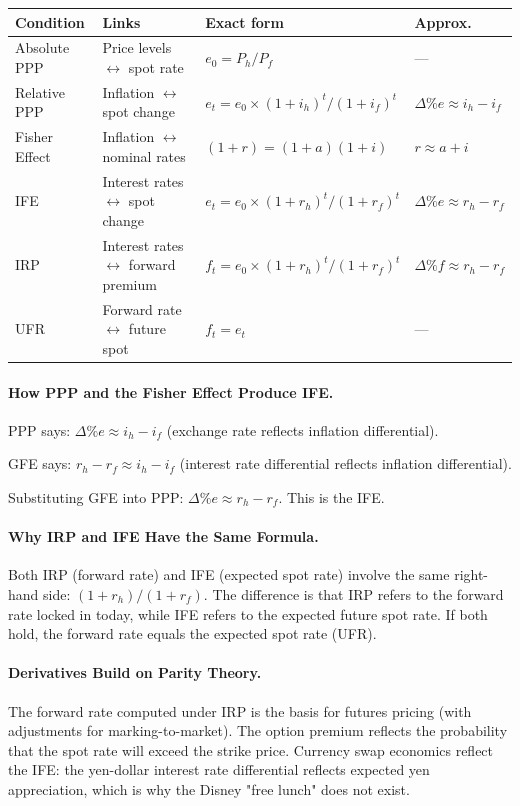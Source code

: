 \documentclass[11pt,a4paper]{article}
\begin{document}
\begin{center}
\begin{tabular}{lp{3.6cm}p{3.8cm}p{2.4cm}}
\toprule
\textbf{Condition} & \textbf{Links} & \textbf{Exact form} & \textbf{Approx.} \\
\midrule
Absolute PPP & Price levels $\leftrightarrow$ spot rate & $e_0 = P_h/P_f$ & --- \\
Relative PPP & Inflation $\leftrightarrow$ spot change & $e_t = e_0 \times (1+i_h)^t/(1+i_f)^t$ & $\Delta\%e \approx i_h - i_f$ \\
Fisher Effect & Inflation $\leftrightarrow$ nominal rates & $(1+r) = (1+a)(1+i)$ & $r \approx a + i$ \\
IFE & Interest rates $\leftrightarrow$ spot change & $e_t = e_0 \times (1+r_h)^t/(1+r_f)^t$ & $\Delta\%e \approx r_h - r_f$ \\
IRP & Interest rates $\leftrightarrow$ forward premium & $f_t = e_0 \times (1+r_h)^t/(1+r_f)^t$ & $\Delta\%f \approx r_h - r_f$ \\
UFR & Forward rate $\leftrightarrow$ future spot & $f_t = e_t$ & --- \\
\bottomrule
\end{tabular}
\end{center}

\paragraph{How PPP and the Fisher Effect Produce IFE.}
PPP says: $\Delta\%e \approx i_h - i_f$ (exchange rate reflects inflation differential).

GFE says: $r_h - r_f \approx i_h - i_f$ (interest rate differential reflects inflation differential).

Substituting GFE into PPP: $\Delta\%e \approx r_h - r_f$. This is the IFE.

\paragraph{Why IRP and IFE Have the Same Formula.}
Both IRP (forward rate) and IFE (expected spot rate) involve the same right-hand side: $(1+r_h)/(1+r_f)$. The difference is that IRP refers to the forward rate locked in today, while IFE refers to the expected future spot rate. If both hold, the forward rate equals the expected spot rate (UFR).

\paragraph{Derivatives Build on Parity Theory.}
The forward rate computed under IRP is the basis for futures pricing (with adjustments for marking-to-market). The option premium reflects the probability that the spot rate will exceed the strike price. Currency swap economics reflect the IFE: the yen-dollar interest rate differential reflects expected yen appreciation, which is why the Disney "free lunch" does not exist.
\end{document}
